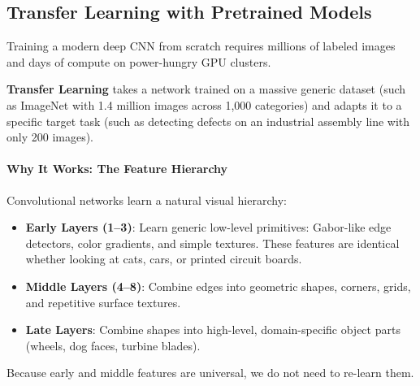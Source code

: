 \subsection{Transfer Learning with Pretrained Models}\label{subsec:transfer_learning}

\begin{keyidea}
Training a modern deep CNN from scratch requires millions of labeled images and days of compute on power-hungry GPU clusters. 

\textbf{Transfer Learning} takes a network trained on a massive generic dataset (such as ImageNet with 1.4 million images across 1,000 categories) and adapts it to a specific target task (such as detecting defects on an industrial assembly line with only 200 images).
\end{keyidea}

\paragraph{Why It Works: The Feature Hierarchy}
Convolutional networks learn a natural visual hierarchy:
\begin{itemize}
    \item \textbf{Early Layers (1--3)}: Learn generic low-level primitives: Gabor-like edge detectors, color gradients, and simple textures. These features are identical whether looking at cats, cars, or printed circuit boards.
    \item \textbf{Middle Layers (4--8)}: Combine edges into geometric shapes, corners, grids, and repetitive surface textures.
    \item \textbf{Late Layers}: Combine shapes into high-level, domain-specific object parts (wheels, dog faces, turbine blades).
\end{itemize}

Because early and middle features are universal, we do not need to re-learn them.

